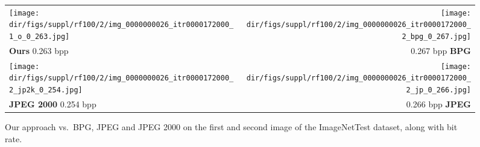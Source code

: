 \begin{subappendices}
\begin{figure*}[!h]
\begin{tabular}{lr}
\texttt{[image: \\dir/figs/suppl/rf100/2/img\_0000000026\_itr0000172000\_1\_o\_0\_263.jpg]}&
\texttt{[image: \\dir/figs/suppl/rf100/2/img\_0000000026\_itr0000172000\_2\_bpg\_0\_267.jpg]}\\[-0.5ex]
\textbf{Ours} 0.263 bpp & 0.267 bpp \textbf{BPG} \\
\texttt{[image: \\dir/figs/suppl/rf100/2/img\_0000000026\_itr0000172000\_2\_jp2k\_0\_254.jpg]}&
\texttt{[image: \\dir/figs/suppl/rf100/2/img\_0000000026\_itr0000172000\_2\_jp\_0\_266.jpg]}\\
\textbf{JPEG 2000} 0.254 bpp & 0.266 bpp \textbf{JPEG}

\end{tabular}
\caption{\label{imgc:fig:vis_ex_ImageNetTest_first}Our approach vs.\ BPG, JPEG and JPEG 2000 on the first and second image of the ImageNetTest dataset, along with bit rate.}
\end{figure*}



\end{subappendices}
